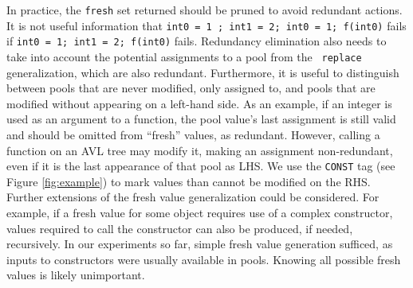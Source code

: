 In practice, the {\tt fresh} set returned should be pruned to avoid
redundant actions.  It is not useful information that {\tt int0 = 1 ; int1 = 2; int0 = 1; f(int0)} fails if {\tt int0 = 1;
  int1 = 2; f(int0)} fails.  Redundancy elimination also needs to take
into account the potential assignments to a pool from the {\tt
  replace} generalization, which are also redundant.  Furthermore, it
is useful to distinguish between pools that are never modified, only
assigned to, and pools that are modified without appearing on a
left-hand side.  As an example, if an integer is used as an argument
to a function, the pool value's last assignment is still valid and
should be omitted from ``fresh'' values, as redundant.  However,
calling a function on an AVL tree may modify it, making an assignment
non-redundant, even if it is the last appearance of that pool as LHS.
We use the {\tt CONST} tag (see Figure \ref{fig:example}) to mark
values than cannot be modified on the RHS.  Further extensions of the
fresh value generalization could be considered.  For example, if a
fresh value for some object requires use of a complex constructor,
values required to call the constructor can also be produced, if
needed, recursively.  In our experiments so
far, simple fresh value generation sufficed, as inputs to
constructors were usually available in pools.  Knowing all possible
fresh values is likely unimportant.


